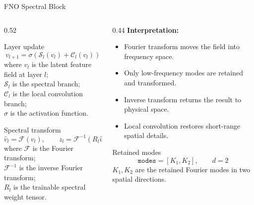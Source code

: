 \documentclass[aspectratio=169,10pt]{beamer}
\begin{document}
\begin{frame}{FNO Spectral Block}
\begin{columns}[T]
    \begin{column}{0.52\textwidth}
        \begin{block}{Layer update}
        \[
        v_{l+1}=\sigma\left(\mathcal{S}_l(v_l)+\mathcal{C}_l(v_l)\right)
        \]
        \scriptsize
        where \(v_l\) is the latent feature field at layer \(l\);\\
        \(\mathcal{S}_l\) is the spectral branch;\\
        \(\mathcal{C}_l\) is the local convolution branch;\\
        \(\sigma\) is the activation function.
        \end{block}

        \begin{block}{Spectral transform}
        \[
        \hat{v}_l=\mathcal{F}(v_l), \qquad
        z_l=\mathcal{F}^{-1}(R_l\hat{v}_l)
        \]
        \scriptsize
        where \(\mathcal{F}\) is the Fourier transform;\\
        \(\mathcal{F}^{-1}\) is the inverse Fourier transform;\\
        \(R_l\) is the trainable spectral weight tensor.
        \end{block}
    \end{column}

    \begin{column}{0.44\textwidth}
        \footnotesize
        \textbf{Interpretation:}
        \begin{itemize}
            \item Fourier transform moves the field into frequency space.
            \item Only low-frequency modes are retained and transformed.
            \item Inverse transform returns the result to physical space.
            \item Local convolution restores short-range spatial details.
        \end{itemize}

        \vspace{0.3cm}

        \begin{block}{Retained modes}
        \[
        \texttt{modes}=[K_1,K_2], \qquad d=2
        \]
        \scriptsize
        \(K_1,K_2\) are the retained Fourier modes in two spatial directions.
        \end{block}
    \end{column}
\end{columns}
\end{frame}
\end{document}
